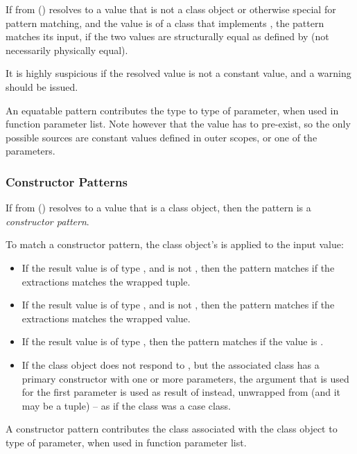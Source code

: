 If  from () resolves to a value that is not a class object or otherwise special for pattern matching, and the value is of a class that implements , the pattern matches its input, if the two values are structurally equal as defined by  (not necessarily physically equal).

It is highly suspicious if the resolved value is not a constant value, and a warning should be issued. 

An equatable pattern contributes the type  to type of parameter, when used in function parameter list. Note however that the value has to pre-exist, so the only possible sources are constant values defined in outer scopes, or one of the parameters.





\subsubsection{Constructor Patterns}
\label{sec:constructor-patterns}

If  from () resolves to a value that is a class object, then the pattern is a {\em constructor pattern}. 

To match a constructor pattern, the class object's  is applied to the input value:
\begin{itemize}
  \item If the result value is of type , and is not , then the pattern matches if the extractions matches the wrapped tuple. 
  \item If the result value is of type , and is not , then the pattern matches if the extractions matches the wrapped value. 
  \item If the result value is of type , then the pattern matches if the value is . 
  \item If the class object does not respond to , but the associated class has a primary constructor with one or more parameters, the argument that is used for the first parameter is used as result of  instead, unwrapped from  (and it may be a tuple) -- as if the class was a case class. 
\end{itemize} 

A constructor pattern contributes the class associated with the class object to type of parameter, when used in function parameter list. 





